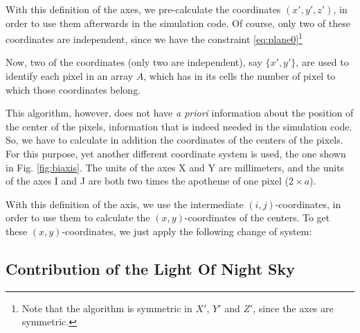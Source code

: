 
With this definition of the axes, we pre-calculate the coordinates
$(x',y',z')$, in order to use them afterwards in the simulation code.
Of course, only two of these coordinates are independent, since we
have the constraint \eqref{eq:plane0}\footnote{Note that the algorithm
  is symmetric in $X'$, $Y'$ and $Z'$, since the axes are symmetric.}
  
Now, two of the coordinates (only two are independent), say
$\{x',y'\}$, are used to identify each pixel in an array $A$, which
has in its cells the number of pixel to which those coordinates
belong.

This algorithm, however, does not have {\itshape a priori} information
about the position of the center of the pixels, information that is
indeed needed in the simulation code. So, we have to calculate in
addition the coordinates of the centers of the pixels. For this
purpose, yet another different coordinate system is used, the one
shown in Fig. \ref{fig:biaxis}. The units of the axes X and Y are
millimeters, and the units of the axes I and J are both two times the
apotheme of one pixel ($2 \times a$).


With this definition of the axis, we use the intermediate
$(i,j)$-coordinates, in order to use them to calculate the
$(x,y)$-coordinates of the centers. To get these $(x,y)$-coordinates,
we just apply the following change of system:
%
\bitoeucleq

\afterpage{\clearpage}

\subsection{Contribution of the Light Of Night Sky}

